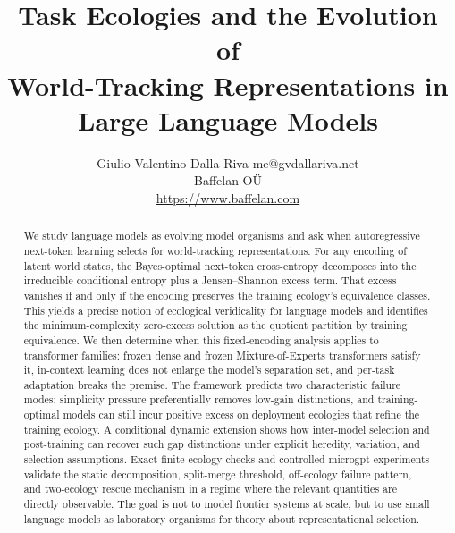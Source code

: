 \documentclass[twoside,11pt]{article}
\begin{document}

\title{Task Ecologies and the Evolution of\\
World-Tracking Representations in Large Language Models}

\author{\name Giulio Valentino Dalla Riva \email me@gvdallariva.net \\
        \addr Baffelan O\"U \\
        \addr \url{https://www.baffelan.com}}

\editor{}

\maketitle

\begin{abstract}
We study language models as evolving model organisms and ask
when autoregressive next-token learning selects for world-tracking
representations. For any encoding of latent world states, the
Bayes-optimal next-token cross-entropy decomposes into the irreducible
conditional entropy plus a Jensen--Shannon excess term. That excess
vanishes if and only if the encoding preserves the training ecology's
equivalence classes. This yields a precise notion of ecological
veridicality for language models and identifies the minimum-complexity
zero-excess solution as the quotient partition by training equivalence.
We then determine when this fixed-encoding analysis applies to
transformer families: frozen dense and frozen Mixture-of-Experts
transformers satisfy it, in-context learning does not enlarge the
model's separation set, and per-task adaptation breaks the premise. The
framework predicts two characteristic failure modes: simplicity pressure
preferentially removes low-gain distinctions, and training-optimal
models can still incur positive excess on deployment ecologies that
refine the training ecology. A conditional dynamic extension shows how
inter-model selection and post-training can recover such gap
distinctions under explicit heredity, variation, and selection
assumptions. Exact finite-ecology checks and controlled microgpt
experiments validate the static decomposition, split-merge threshold,
off-ecology failure pattern, and two-ecology rescue mechanism in a
regime where the relevant quantities are directly observable. The goal
is not to model frontier systems at scale, but to use small language
models as laboratory organisms for theory about representational
selection.
\end{abstract}
\end{document}
